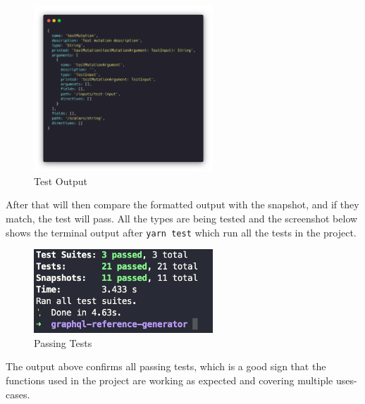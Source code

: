 \begin{figure}[H]
  \centering
  \includegraphics[width=0.6\textwidth]{figures/code/testMutation.png}
  \caption{Test Output}
  \label{f:testMutation}
\end{figure}

After that will then compare the formatted output with the snapshot, and if they
match, the test will pass. All the types are being tested and the screenshot
below shows the terminal output after \texttt{yarn test} which run all the tests
in the project.

\begin{figure}[H]
  \centering
  \includegraphics[width=0.6\textwidth]{figures/testspass.png}
  \caption{Passing Tests}
  \label{f:testspass}
\end{figure}

The output above confirms all passing tests, which is a good sign that the
functions used in the project are working as expected and covering multiple
uses-cases.
